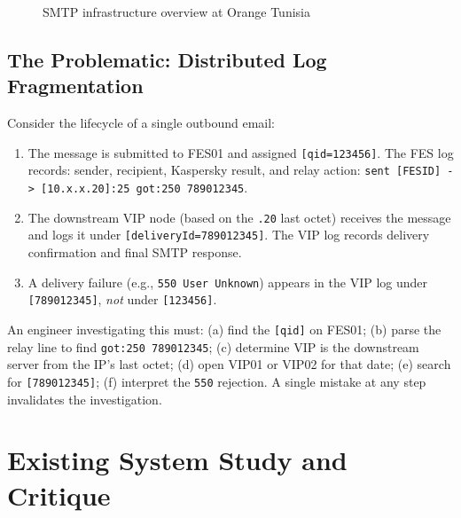 \documentclass[12pt,a4paper,oneside]{report}
\begin{document}
\begin{figure}[H]
\caption{SMTP infrastructure overview at Orange Tunisia}
\label{fig:infra-overview}
\end{figure}

\subsection{The Problematic: Distributed Log Fragmentation}

Consider the lifecycle of a single outbound email:

\begin{enumerate}
  \item The message is submitted to FES01 and assigned \texttt{[qid=123456]}. The FES log records: sender, recipient, Kaspersky result, and relay action: \texttt{sent [FESID] -> [10.x.x.20]:25 got:250 789012345}.
  \item The downstream VIP node (based on the \texttt{.20} last octet) receives the message and logs it under \texttt{[deliveryId=789012345]}. The VIP log records delivery confirmation and final SMTP response.
  \item A delivery failure (e.g., \texttt{550 User Unknown}) appears in the VIP log under \texttt{[789012345]}, \emph{not} under \texttt{[123456]}.
\end{enumerate}

An engineer investigating this must: (a) find the \texttt{[qid]} on FES01; (b) parse the relay line to find \texttt{got:250 789012345}; (c) determine VIP is the downstream server from the IP's last octet; (d) open VIP01 or VIP02 for that date; (e) search for \texttt{[789012345]}; (f) interpret the \texttt{550} rejection.
A single mistake at any step invalidates the investigation.

\section{Existing System Study and Critique}
\end{document}
